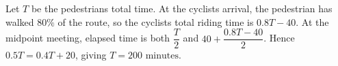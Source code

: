 Let $T$ be the pedestrian\textquotesingle s total time. At the cyclist\textquotesingle s arrival, the pedestrian has walked $80\%$ of the route, so the cyclist\textquotesingle s total riding time is $0.8T-40$. At the midpoint meeting, elapsed time is both $\dfrac{T}{2}$ and $40+\dfrac{0.8T-40}{2}$. Hence $0.5T=0.4T+20$, giving $\boxed{T=200\text{ minutes}}$.
